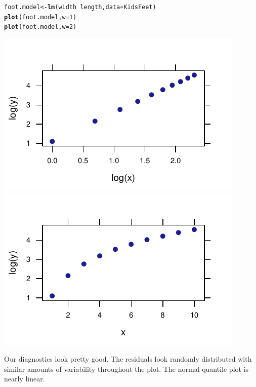 \documentclass[twoside]{book}\usepackage[]{graphicx}\usepackage[]{xcolor}
\makeatletter
\def\maxwidth{ %
  \ifdim\Gin@nat@width>\linewidth
    \linewidth
  \else
    \Gin@nat@width
  \fi
}
\newcommand{\hlnum}[1]{\textcolor[rgb]{0.686,0.059,0.569}{#1}}%
\newcommand{\hlopt}[1]{\textcolor[rgb]{0,0,0}{#1}}%
\newcommand{\hlstd}[1]{\textcolor[rgb]{0.345,0.345,0.345}{#1}}%
\newcommand{\hlkwb}[1]{\textcolor[rgb]{0.69,0.353,0.396}{#1}}%
\newcommand{\hlkwc}[1]{\textcolor[rgb]{0.333,0.667,0.333}{#1}}%
\newcommand{\hlkwd}[1]{\textcolor[rgb]{0.737,0.353,0.396}{\textbf{#1}}}%
\newenvironment{kframe}{%
 \def\at@end@of@kframe{}%
 \ifinner\ifhmode%
  \def\at@end@of@kframe{\end{minipage}}%
  \begin{minipage}{\columnwidth}%
 \fi\fi%
 \def\FrameCommand##1{\hskip\@totalleftmargin \hskip-\fboxsep
 \colorbox{shadecolor}{##1}\hskip-\fboxsep
     \hskip-\linewidth \hskip-\@totalleftmargin \hskip\columnwidth}%
 \MakeFramed {\advance\hsize-\width
   \@totalleftmargin\z@ \linewidth\hsize
   \@setminipage}}%
 {\par\unskip\endMakeFramed%
 \at@end@of@kframe}
\newenvironment{knitrout}{}{} %
\makeatother
\begin{document}
\begin{solution}
\begin{knitrout}
\color{fgcolor}\begin{kframe}
\begin{alltt}
\hlstd{foot.model} \hlkwb{<-} \hlkwd{lm}\hlstd{(width} \hlopt{~} \hlstd{length,} \hlkwc{data} \hlstd{= KidsFeet)}
\hlkwd{plot}\hlstd{(foot.model,} \hlkwc{w} \hlstd{=} \hlnum{1}\hlstd{)}
\hlkwd{plot}\hlstd{(foot.model,} \hlkwc{w} \hlstd{=} \hlnum{2}\hlstd{)}
\end{alltt}
\end{kframe}

{\centering \includegraphics[width=\maxwidth]{figures/fig-unnamed-chunk-202-1} 
\includegraphics[width=\maxwidth]{figures/fig-unnamed-chunk-202-2} 

}



\end{knitrout}
Our diagnostics look pretty good.  The residuals look randomly distributed with
similar amounts of variability throughout the plot.  The normal-quantile plot
is nearly linear.


\end{solution}
\end{document}
